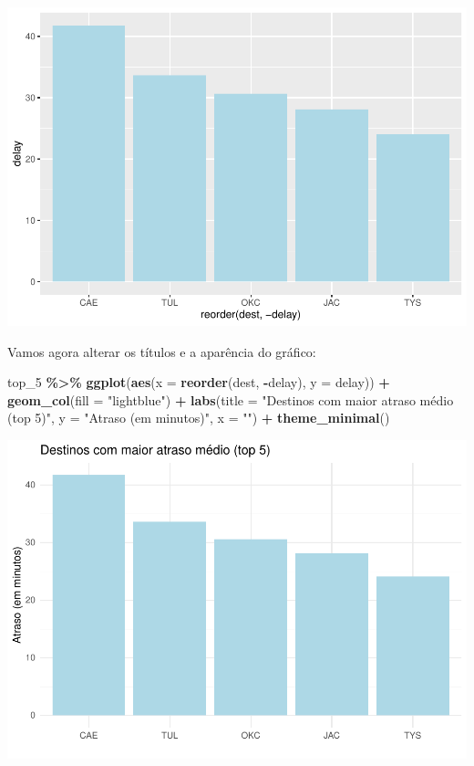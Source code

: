 \documentclass[
]{book}
\newenvironment{Shaded}{\begin{snugshade}}{\end{snugshade}}
\newcommand{\AttributeTok}[1]{\textcolor[rgb]{0.13,0.29,0.53}{#1}}
\newcommand{\FunctionTok}[1]{\textcolor[rgb]{0.13,0.29,0.53}{\textbf{#1}}}
\newcommand{\NormalTok}[1]{#1}
\newcommand{\SpecialCharTok}[1]{\textcolor[rgb]{0.81,0.36,0.00}{\textbf{#1}}}
\newcommand{\StringTok}[1]{\textcolor[rgb]{0.31,0.60,0.02}{#1}}
\begin{document}
\includegraphics{AprendendoR_files/figure-latex/unnamed-chunk-67-1.pdf}

Vamos agora alterar os títulos e a aparência do gráfico:

\begin{Shaded}
\begin{Highlighting}[]
\NormalTok{top\_5 }\SpecialCharTok{\%\textgreater{}\%} 
  \FunctionTok{ggplot}\NormalTok{(}\FunctionTok{aes}\NormalTok{(}\AttributeTok{x =} \FunctionTok{reorder}\NormalTok{(dest, }\SpecialCharTok{{-}}\NormalTok{delay), }\AttributeTok{y =}\NormalTok{ delay)) }\SpecialCharTok{+}
  \FunctionTok{geom\_col}\NormalTok{(}\AttributeTok{fill =} \StringTok{"lightblue"}\NormalTok{) }\SpecialCharTok{+}
  \FunctionTok{labs}\NormalTok{(}\AttributeTok{title =} \StringTok{"Destinos com maior atraso médio (top 5)"}\NormalTok{,}
       \AttributeTok{y =} \StringTok{"Atraso (em minutos)"}\NormalTok{,}
       \AttributeTok{x =} \StringTok{""}\NormalTok{) }\SpecialCharTok{+}
  \FunctionTok{theme\_minimal}\NormalTok{()}
\end{Highlighting}
\end{Shaded}

\includegraphics{AprendendoR_files/figure-latex/unnamed-chunk-68-1.pdf}
\end{document}
